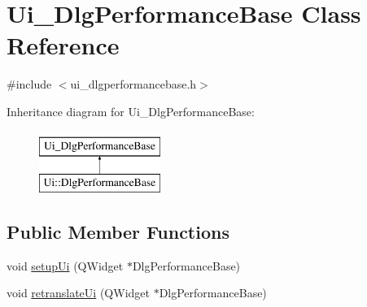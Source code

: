 \hypertarget{classUi__DlgPerformanceBase}{\section{Ui\+\_\+\+Dlg\+Performance\+Base Class Reference}
\label{classUi__DlgPerformanceBase}
}


{\ttfamily \#include $<$ui\+\_\+dlgperformancebase.\+h$>$}

Inheritance diagram for Ui\+\_\+\+Dlg\+Performance\+Base\+:\begin{figure}[H]
\begin{center}
\leavevmode
\includegraphics[height=2.000000cm]{classUi__DlgPerformanceBase}
\end{center}
\end{figure}
\subsection*{Public Member Functions}
\begin{DoxyCompactItemize}
\item 
void \hyperlink{classUi__DlgPerformanceBase_a8bb6e61830ad3c15c7cfd25402103eff}{setup\+Ui} (Q\+Widget $\ast$Dlg\+Performance\+Base)
\item 
void \hyperlink{classUi__DlgPerformanceBase_af4afa7d4d099f4b8448d8ceb5b3b6282}{retranslate\+Ui} (Q\+Widget $\ast$Dlg\+Performance\+Base)
\end{DoxyCompactItemize}
